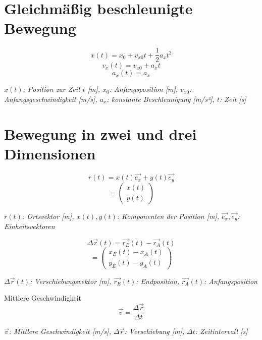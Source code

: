\documentclass[a4paper,10pt]{article}
\newenvironment{displayformula}
{
	\begin{framed}
		\color{formulaColor}
	}
	{\end{framed}}
\newcommand{\formulalegend}[1]{%
	\par\vspace{0.5ex}%
	{{\color{legendColor}\RaggedRight\small\textit{#1}}}%
	\par\vspace{1.5ex}%
}
\begin{document}
\section{Gleichmäßig beschleunigte Bewegung}

\begin{displayformula}
	\[
	x(t) = x_0 + v_{x0}t + \frac{1}{2} a_x t^2 
	\]
	\[
	v_x(t) = v_{x0} + a_x t
	\]
	\[
	a_x(t) = a_x
	\]
\end{displayformula}
\formulalegend{
	\( x(t) \): Position zur Zeit \( t \) [m], \( x_0 \): Anfangsposition [m], \( v_{x0} \): Anfangsgeschwindigkeit [m/s], \( a_x \): konstante Beschleunigung [m/s²], \( t \): Zeit [s]
}

\newpage

\section{Bewegung in zwei und drei Dimensionen}

\begin{displayformula}
	\[
	r(t) = x(t)\vec{e_x} + y(t)\vec{e_y}
	\]
	\[
	= \begin{pmatrix}
		x(t) \\
		y(t)
	\end{pmatrix}
	\]
\end{displayformula}
\formulalegend{
	\( r(t) \): Ortsvektor [m], \( x(t), y(t) \): Komponenten der Position [m], \( \vec{e_x}, \vec{e_y} \): Einheitsvektoren
}

\begin{displayformula}
	\[
	\Delta \vec{r}(t) = \vec{r_E}(t) - \vec{r_A}(t)
	\]
	\[
	= \begin{pmatrix}
		x_E(t) - x_A(t) \\
		y_E(t) - y_A(t)
	\end{pmatrix}
	\]
\end{displayformula}
\formulalegend{
	\( \Delta \vec{r}(t) \): Verschiebungsvektor [m], \( \vec{r_E}(t) \): Endposition, \( \vec{r_A}(t) \): Anfangsposition
}

\begin{displayformula}
	Mittlere Geschwindigkeit
	\[
	\vec{v} = \frac{\Delta \vec{r}}{\Delta t}
	\]
\end{displayformula}
\formulalegend{
	\( \vec{v} \): Mittlere Geschwindigkeit [m/s], \( \Delta \vec{r} \): Verschiebung [m], \( \Delta t \): Zeitintervall [s]
}
\end{document}
